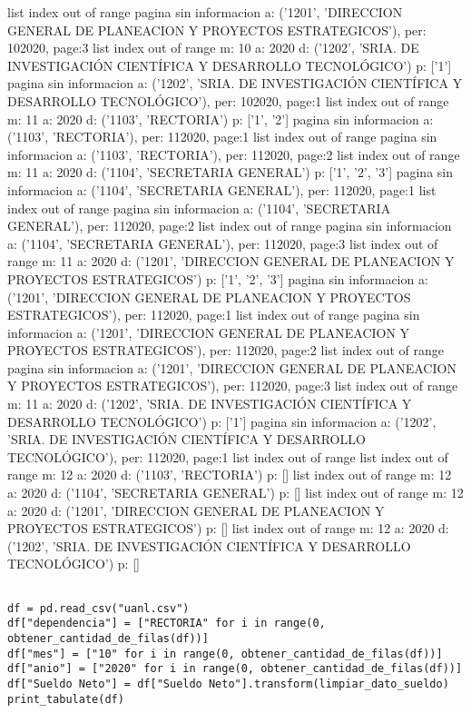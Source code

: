 \documentclass[11pt]{article}
\begin{document}
list index out of range
pagina sin informacion a: ('1201', 'DIRECCION GENERAL DE PLANEACION Y PROYECTOS ESTRATEGICOS'), per: 102020, page:3
list index out of range
m: 10 a: 2020 d: ('1202', 'SRIA. DE INVESTIGACIÓN CIENTÍFICA Y DESARROLLO TECNOLÓGICO') p: ['1']
pagina sin informacion a: ('1202', 'SRIA. DE INVESTIGACIÓN CIENTÍFICA Y DESARROLLO TECNOLÓGICO'), per: 102020, page:1
list index out of range
m: 11 a: 2020 d: ('1103', 'RECTORIA') p: ['1', '2']
pagina sin informacion a: ('1103', 'RECTORIA'), per: 112020, page:1
list index out of range
pagina sin informacion a: ('1103', 'RECTORIA'), per: 112020, page:2
list index out of range
m: 11 a: 2020 d: ('1104', 'SECRETARIA GENERAL') p: ['1', '2', '3']
pagina sin informacion a: ('1104', 'SECRETARIA GENERAL'), per: 112020, page:1
list index out of range
pagina sin informacion a: ('1104', 'SECRETARIA GENERAL'), per: 112020, page:2
list index out of range
pagina sin informacion a: ('1104', 'SECRETARIA GENERAL'), per: 112020, page:3
list index out of range
m: 11 a: 2020 d: ('1201', 'DIRECCION GENERAL DE PLANEACION Y PROYECTOS ESTRATEGICOS') p: ['1', '2', '3']
pagina sin informacion a: ('1201', 'DIRECCION GENERAL DE PLANEACION Y PROYECTOS ESTRATEGICOS'), per: 112020, page:1
list index out of range
pagina sin informacion a: ('1201', 'DIRECCION GENERAL DE PLANEACION Y PROYECTOS ESTRATEGICOS'), per: 112020, page:2
list index out of range
pagina sin informacion a: ('1201', 'DIRECCION GENERAL DE PLANEACION Y PROYECTOS ESTRATEGICOS'), per: 112020, page:3
list index out of range
m: 11 a: 2020 d: ('1202', 'SRIA. DE INVESTIGACIÓN CIENTÍFICA Y DESARROLLO TECNOLÓGICO') p: ['1']
pagina sin informacion a: ('1202', 'SRIA. DE INVESTIGACIÓN CIENTÍFICA Y DESARROLLO TECNOLÓGICO'), per: 112020, page:1
list index out of range
list index out of range
m: 12 a: 2020 d: ('1103', 'RECTORIA') p: []
list index out of range
m: 12 a: 2020 d: ('1104', 'SECRETARIA GENERAL') p: []
list index out of range
m: 12 a: 2020 d: ('1201', 'DIRECCION GENERAL DE PLANEACION Y PROYECTOS ESTRATEGICOS') p: []
list index out of range
m: 12 a: 2020 d: ('1202', 'SRIA. DE INVESTIGACIÓN CIENTÍFICA Y DESARROLLO TECNOLÓGICO') p: []


\begin{verbatim}

df = pd.read_csv("uanl.csv")
df["dependencia"] = ["RECTORIA" for i in range(0, obtener_cantidad_de_filas(df))]
df["mes"] = ["10" for i in range(0, obtener_cantidad_de_filas(df))]
df["anio"] = ["2020" for i in range(0, obtener_cantidad_de_filas(df))]
df["Sueldo Neto"] = df["Sueldo Neto"].transform(limpiar_dato_sueldo)
print_tabulate(df)
\end{verbatim}
\end{document}
